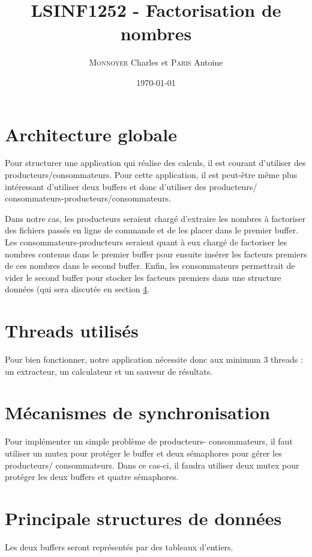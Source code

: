 \documentclass{scrartcl}
\title{LSINF1252 - Factorisation de nombres}
\author{\textsc{Monnoyer} Charles et \textsc{Paris} Antoine}
\date{\today}
\begin{document}
\maketitle

\section{Architecture globale}
Pour structurer une application qui réalise des calculs,
il est courant d'utiliser des producteurs/consommateurs\cite{syll}.
Pour cette application, il est peut-être même plus intéressant
d'utiliser deux buffers et donc d'utiliser des producteurs/
consommateurs-producteurs/consommateurs.

Dans notre cas, les producteurs seraient chargé d'extraire
les nombres à factoriser des fichiers passés en ligne
de commande et de les placer dans le premier buffer. Les
consommateurs-producteurs seraient quant à eux chargé de
factoriser les nombres contenus dans le premier buffer pour
ensuite insérer les facteurs premiers de ces nombres
dans le second buffer. Enfin, les consommateurs
permettrait de vider le second buffer pour stocker les
facteurs premiers dans une structure données (qui sera
discutée en section \ref{sec:data-structure}.


\section{Threads utilisés}
Pour bien fonctionner, notre application nécessite donc
aux minimum 3 threads : un extracteur, un calculateur et
un sauveur de résultats.

\section{Mécanismes de synchronisation}
Pour implémenter un simple problème de producteurs-
consommateurs, il faut utiliser un mutex pour protéger
le buffer et deux sémaphores pour gérer les producteurs/
consommateurs. Dans ce cas-ci, il faudra utiliser deux
mutex pour protéger les deux buffers et quatre sémaphores.

\section{Principale structures de données}
\label{sec:data-structure}
Les deux buffers seront représentés par des tableaux d'entiers.
\end{document}
